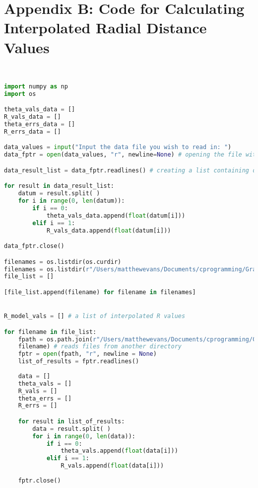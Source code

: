 \documentclass{article}
\begin{document}
\newpage
\section*{Appendix B: Code for Calculating Interpolated Radial Distance Values}
\label{app:appendix_B}


\begin{footnotesize}
\begin{lstlisting}[language=Python]


import numpy as np
import os

theta_vals_data = []
R_vals_data = []
theta_errs_data = []
R_errs_data = []

data_values = input("Input the data file you wish to read in: ")
data_fptr = open(data_values, "r", newline=None) # opening the file with the observed data 

data_result_list = data_fptr.readlines() # creating a list containing observed data results

for result in data_result_list:
    datum = result.split( )
    for i in range(0, len(datum)):
        if i == 0:
            theta_vals_data.append(float(datum[i]))
        elif i == 1:
            R_vals_data.append(float(datum[i]))

data_fptr.close()

filenames = os.listdir(os.curdir)
filenames = os.listdir(r"/Users/matthewevans/Documents/cprogramming/Graphs/PHY3138/PHY3147/phi0_0.505_late")
file_list = []

[file_list.append(filename) for filename in filenames]


R_model_vals = [] # a list of interpolated R values

for filename in file_list:
    fpath = os.path.join(r"/Users/matthewevans/Documents/cprogramming/Graphs/PHY3138/PHY3147/phi0_0.505_late", \
    filename) # reads files from another directory
    fptr = open(fpath, "r", newline = None)
    list_of_results = fptr.readlines()
 
    data = []
    theta_vals = []
    R_vals = []
    theta_errs = []
    R_errs = [] 

    for result in list_of_results:
        data = result.split( )
        for i in range(0, len(data)):
            if i == 0:
                theta_vals.append(float(data[i]))
            elif i == 1:
                R_vals.append(float(data[i]))
        
    fptr.close()
      

\end{lstlisting}
\end{footnotesize}
\end{document}
